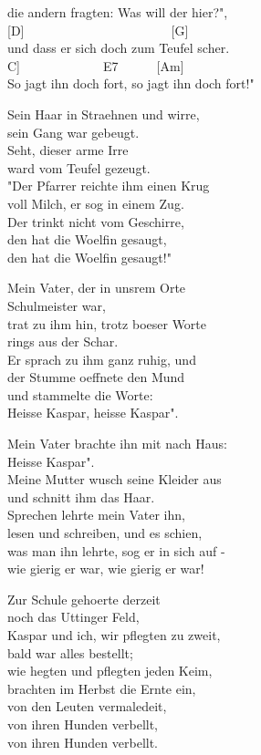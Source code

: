 \documentclass[
  letterpaper,
  twoside=false]{scrbook}
\begin{document}
die andern fragten: Was will der hier?",\\
{[}D{]}~~~~~~~~~~~~~~~~~~~~~~~{[}G{]}\\
und dass er sich doch zum Teufel scher\textquotesingle.\\
\hspace*{0.333em}\hspace*{0.333em}\hspace*{0.333em}\hspace*{0.333em}{[}C{]}~~~~~~~~~~~~~E7~~~~~~{[}Am{]}\\
So jagt ihn doch fort, so jagt ihn doch fort!"

Sein Haar in Straehnen und wirre,\\
sein Gang war gebeugt.\\
Seht, dieser arme Irre\\
ward vom Teufel gezeugt.\\
"Der Pfarrer reichte ihm einen Krug\\
voll Milch, er sog in einem Zug.\\
Der trinkt nicht vom Geschirre,\\
den hat die Woelfin gesaugt,\\
den hat die Woelfin gesaugt!"

Mein Vater, der in uns\textquotesingle rem Orte\\
Schulmeister war,\\
trat zu ihm hin, trotz boeser Worte\\
rings aus der Schar.\\
Er sprach zu ihm ganz ruhig, und\\
der Stumme oeffnete den Mund\\
und stammelte die Worte:\\
Heisse Kaspar, heisse Kaspar".

Mein Vater brachte ihn mit nach Haus:\\
Heisse Kaspar".\\
Meine Mutter wusch seine Kleider aus\\
und schnitt ihm das Haar.\\
Sprechen lehrte mein Vater ihn,\\
lesen und schreiben, und es schien,\\
was man ihn lehrte, sog er in sich auf -\\
wie gierig er war, wie gierig er war!

Zur Schule gehoerte derzeit\\
noch das Uttinger Feld,\\
Kaspar und ich, wir pflegten zu zweit,\\
bald war alles bestellt;\\
wie hegten und pflegten jeden Keim,\\
brachten im Herbst die Ernte ein,\\
von den Leuten vermaledeit,\\
von ihren Hunden verbellt,\\
von ihren Hunden verbellt.
\end{document}
